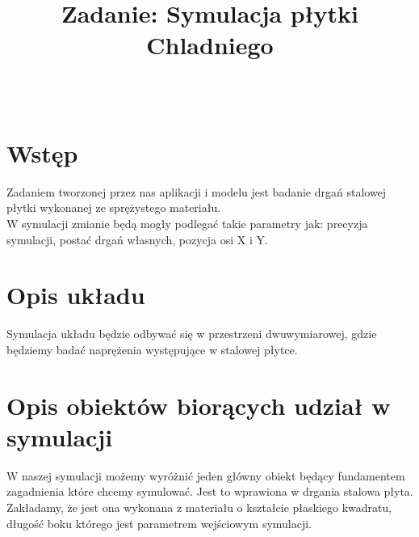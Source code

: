 \documentclass{classrep}
\author{%
  \studentinfo[210347@edu.p.lodz.pl]{Krzysztof Wierzbicki}{210347}\\
  \studentinfo[210209@edu.p.lodz.pl]{Bartosz Jurczewski}{210209}%
}
\title{Zadanie: Symulacja płytki Chladniego }
\begin{document}
\maketitle
\thispagestyle{fancyplain}

\newpage

\section{Wstęp}
Zadaniem tworzonej przez nas aplikacji i modelu jest badanie drgań stalowej płytki wykonanej ze sprężystego materiału. \\
W symulacji zmianie będą mogły podlegać takie parametry jak: precyzja symulacji, postać drgań własnych, pozycja osi X i Y.

\section{Opis układu}
Symulacja układu będzie odbywać się w przestrzeni dwuwymiarowej, gdzie będziemy badać naprężenia występujące w stalowej płytce. 

\section{Opis obiektów biorących udział w symulacji}
W naszej symulacji możemy wyróżnić jeden główny obiekt będący fundamentem zagadnienia które chcemy symulować. Jest to wprawiona w drgania stalowa płyta. Zakładamy, że jest ona wykonana z materiału o kształcie płaskiego kwadratu, długość boku którego jest parametrem wejściowym symulacji.
\end{document}
